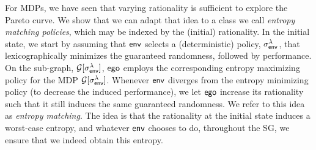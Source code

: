 For MDPs, we have seen that varying rationality is sufficient to explore the Pareto curve. 
We show that we can adapt that idea to a class we call \emph{entropy matching policies}, which may be indexed by the (initial) rationality. 
In the initial state, we start by assuming that $\mathsf{env}$
selects a (deterministic) policy, $\sigma^\lambda_{\mathsf{env}}$, that
lexicographically minimizes the guaranteed randomness, followed by
performance. On the sub-graph, $\mathcal{G}[\sigma^\lambda_{\mathsf{env}}]$, $\mathsf{ego}$
employs the corresponding entropy maximizing policy for the MDP $\mathcal{G}[\sigma^\lambda_{\mathsf{env}}]$. 
Whenever $\mathsf{env}$ diverges from the entropy minimizing policy (to decrease the induced performance), we let $\mathsf{ego}$ increase its rationality such that it still induces the same guaranteed randomness.  We refer to this idea as \emph{entropy matching}. The idea is that the rationality at the initial state induces a worst-case entropy, and whatever $\mathsf{env}$ chooses to do, throughout the SG, we ensure that we indeed obtain this entropy. 
